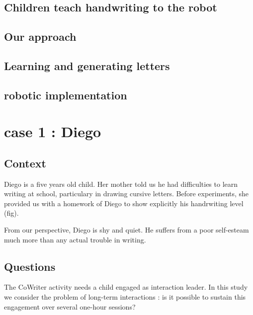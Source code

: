 \documentclass{sig-alternate}
\begin{document}
\subsection{Children teach handwriting to the robot}
\subsection{Our approach}

\subsection{Learning and generating letters}

\subsection{robotic implementation}

\section{case 1 : Diego}
\subsection{Context}
Diego is a five years old child. Her mother told us he had difficulties to learn
writing at school, particulary in drawing cursive letters. Before experiments,
she provided us with a homework of Diego to show explicitly his handrwiting
level (fig). 

From our perspective, Diego is shy and quiet. He suffers from a poor
self-esteam much more than any actual trouble in writing.

\subsection{Questions}

The CoWriter activity needs a child engaged as interaction leader. 
In this study we consider the problem of long-term interactions : is it possible to
sustain this engagement over several one-hour sessions?

\end{document}
